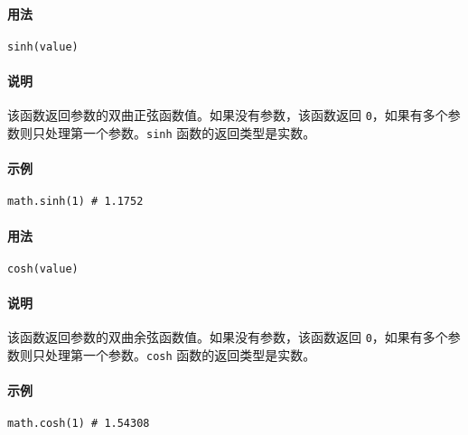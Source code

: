 
\paragraph{用法}
\begin{lstlisting}[language=berry, numbers=none]
sinh(value)
\end{lstlisting}

\paragraph{说明}
该函数返回参数的双曲正弦函数值。如果没有参数，该函数返回 \texttt{0}，如果有多个参数则只处理第一个参数。\texttt{sinh} 函数的返回类型是实数。

\paragraph{示例}
\begin{lstlisting}[language=berry, numbers=none]
math.sinh(1) # 1.1752
\end{lstlisting}


\paragraph{用法}
\begin{lstlisting}[language=berry, numbers=none]
cosh(value)
\end{lstlisting}

\paragraph{说明}
该函数返回参数的双曲余弦函数值。如果没有参数，该函数返回 \texttt{0}，如果有多个参数则只处理第一个参数。\texttt{cosh} 函数的返回类型是实数。

\paragraph{示例}
\begin{lstlisting}[language=berry, numbers=none]
math.cosh(1) # 1.54308
\end{lstlisting}


